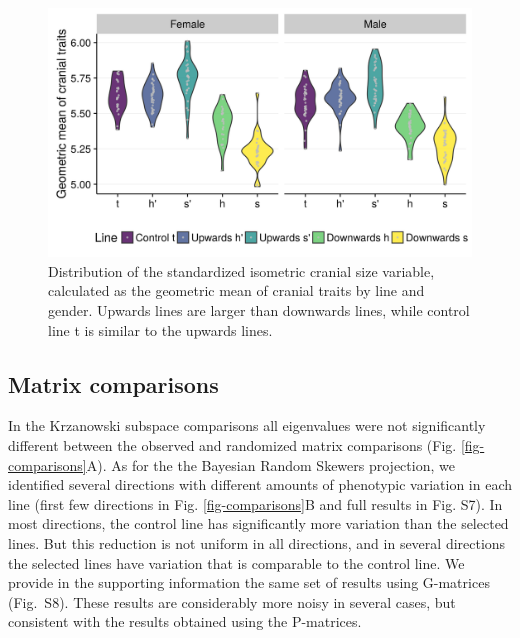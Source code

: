 \begin{refsection}
\begin{figure}
    \centering
    \includegraphics[width=\textwidth]{chapter_ratones/media/figure1.png}
    \caption[Selection response in weight]{Distribution of the
standardized isometric cranial size variable, calculated as the
geometric mean of cranial traits by line and gender. Upwards lines are
larger than downwards lines, while control line t is similar to the
upwards lines.}
    \label{fig-gmchange}
\end{figure}


\subsection{Matrix comparisons}


In the Krzanowski subspace comparisons all eigenvalues were not
significantly different between the observed and randomized matrix
comparisons (Fig. \ref{fig-comparisons}A). As for the the Bayesian
Random Skewers projection, we identified several directions with
different amounts of phenotypic variation in each line (first few
directions in Fig. \ref{fig-comparisons}B and full results in Fig.
S7). In most directions, the control line has significantly more
variation than the selected lines. But this reduction is not uniform in
all directions, and in several directions the selected lines have
variation that is comparable to the control line. We provide in the
supporting information the same set of results using G-matrices
(Fig.~S8). These results are considerably more noisy in several cases,
but consistent with the results obtained using the P-matrices.


\end{refsection}

